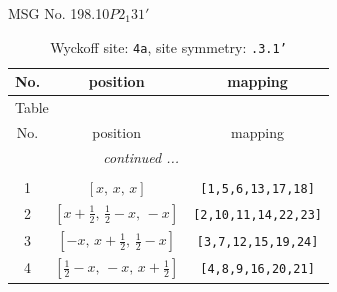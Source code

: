\documentclass[fleqn,8pt]{jsarticle}
\begin{document}
\setcounter{MaxMatrixCols}{32}

\renewcommand{\tablename}{Table~}
\renewcommand{\figurename}{Figure~}
\begin{center}
\LARGE
MSG No. 198.10\quad$P2_{1}31'$
\end{center}
\renewcommand{\arraystretch}{1.2}
\begin{longtable}{ccc}
\caption{Wyckoff site: {\tt 4a}, site symmetry: {\tt .3.1'}}
 \\
 \hline \hline
No. & position & mapping \\ \hline \endfirsthead

\multicolumn{2}{l}{\tablename\ \thetable{}} \\
 \hline \hline
No. & position & mapping \\ \hline \endhead

 \hline \hline
\multicolumn{2}{r}{\footnotesize\it continued ...} \\ \endfoot

 \hline \hline
\multicolumn{2}{r}{} \\ \endlastfoot

1 & $\left[ x,\, x,\, x \right]$ & {\tt [1,5,6,13,17,18]} \\ \hline
2 & $\left[ x + \frac{1}{2},\, \frac{1}{2} - x,\, - x \right]$ & {\tt [2,10,11,14,22,23]} \\ \hline
3 & $\left[ - x,\, x + \frac{1}{2},\, \frac{1}{2} - x \right]$ & {\tt [3,7,12,15,19,24]} \\ \hline
4 & $\left[ \frac{1}{2} - x,\, - x,\, x + \frac{1}{2} \right]$ & {\tt [4,8,9,16,20,21]} \\
\end{longtable}
\renewcommand{\arraystretch}{1.2}
\end{document}
